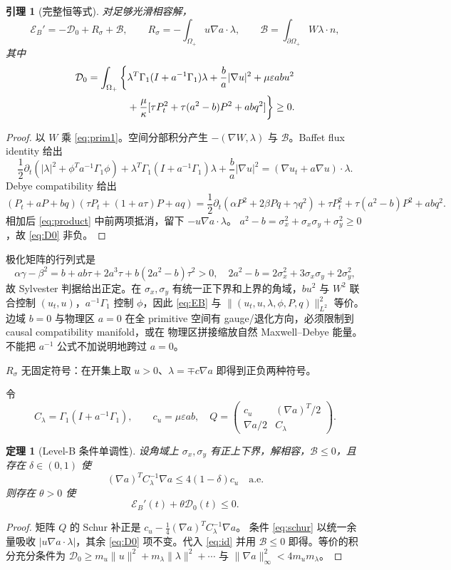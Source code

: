 \documentclass[UTF8,a4paper,11pt]{ctexart}
\newtheorem{lemma}{引理}
\newtheorem{theorem}{定理}
\newcommand{\E}{\mathcal E}
\newcommand{\D}{\mathcal D}
\newcommand{\Om}{\Omega}
\newcommand{\sx}{\sigma_x}
\newcommand{\sy}{\sigma_y}
\newcommand{\ep}{\varepsilon}
\newcommand{\ip}[2]{\left(#1,#2\right)}
\begin{document}
\begin{lemma}[完整恒等式]\label{lem:identity}
对足够光滑相容解，
\begin{equation}\label{eq:id}
 \E_B'=-\D_0+R_\sigma+\mathcal B,
 \qquad R_\sigma=-\int_{\Om_+}u\nabla a\cdot\lambda,
 \qquad \mathcal B=\int_{\partial\Om_+}W\lambda\cdot n,
\end{equation}
其中
\begin{align}\label{eq:D0}
\D_0=\int_{\Om_+}\bigg\{&
 \lambda^T\Gamma_1(I+a^{-1}\Gamma_1)\lambda+\frac ba|\nabla u|^2
 +\mu\ep ab u^2\\
&+\frac\mu\kappa[\tau P_t^2+\tau(a^2-b)P^2+abq^2]\bigg\}\ge0.\notag
\end{align}
\end{lemma}
\begin{proof}
以 $W$ 乘 \eqref{eq:prim1}。空间分部积分产生 $-\ip{\nabla W}{\lambda}$ 与
$\mathcal B$。Baffet flux identity 给出
\[
 \frac12\partial_t(|\lambda|^2+\phi^Ta^{-1}\Gamma_1\phi)
 +\lambda^T\Gamma_1(I+a^{-1}\Gamma_1)\lambda+\frac ba|\nabla u|^2
 =(\nabla u_t+a\nabla u)\cdot\lambda.
\]
Debye compatibility 给出
\[
(P_t+aP+bq)(\tau P_t+(1+a\tau)P+aq)
=\frac12\partial_t(\alpha P^2+2\beta Pq+\gamma q^2)
+\tau P_t^2+\tau(a^2-b)P^2+abq^2.
\]
相加后 \eqref{eq:product} 中前两项抵消，留下 $-u\nabla a\cdot\lambda$。
$a^2-b=\sx^2+\sx\sy+\sy^2\ge0$，故 \eqref{eq:D0} 非负。
\end{proof}

极化矩阵的行列式是
\[
 \alpha\gamma-\beta^2=b+ab\tau+2a^3\tau+b(2a^2-b)\tau^2>0,
\quad 2a^2-b=2\sx^2+3\sx\sy+2\sy^2,
\]
故 Sylvester 判据给出正定。在 $\sx,\sy$ 有统一正下界和上界的角域，$b u^2$ 与
$W^2$ 联合控制 $(u_t,u)$，$a^{-1}\Gamma_1$ 控制 $\phi$，因此 \eqref{eq:EB}
与 $\|(u_t,u,\lambda,\phi,P,q)\|_{L^2}^2$ 等价。边域 $b=0$ 与物理区 $a=0$
在全 primitive 空间有 gauge/退化方向，必须限制到 causal compatibility manifold，或在
物理区拼接缩放自然 Maxwell--Debye 能量。不能把 $a^{-1}$ 公式不加说明地跨过 $a=0$。

$R_\sigma$ 无固定符号：在开集上取 $u>0$、$\lambda=\mp c\nabla a$ 即得到正负两种符号。

令
\[
 C_\lambda=\Gamma_1(I+a^{-1}\Gamma_1),\qquad c_u=\mu\ep ab,
\quad Q=\begin{pmatrix}c_u&(\nabla a)^T/2\\ \nabla a/2&C_\lambda\end{pmatrix}.
\]
\begin{theorem}[Level-B 条件单调性]\label{thm:levelb}
设角域上 $\sx,\sy$ 有正上下界，解相容，$\mathcal B\le0$，且存在
$\delta\in(0,1)$ 使
\begin{equation}\label{eq:schur}
 (\nabla a)^TC_\lambda^{-1}\nabla a\le4(1-\delta)c_u
 \quad\text{a.e.}
\end{equation}
则存在 $\theta>0$ 使
\[
 \E_B'(t)+\theta\D_0(t)\le0.
\]
\end{theorem}
\begin{proof}
矩阵 $Q$ 的 Schur 补正是
$c_u-\frac14(\nabla a)^TC_\lambda^{-1}\nabla a$。
条件 \eqref{eq:schur} 以统一余量吸收
$|u\nabla a\cdot\lambda|$，其余 \eqref{eq:D0} 项不变。代入
\eqref{eq:id} 并用 $\mathcal B\le0$ 即得。等价的积分充分条件为
$\D_0\ge m_u\|u\|^2+m_\lambda\|\lambda\|^2+\cdots$ 与
$\|\nabla a\|_\infty^2<4m_um_\lambda$。
\end{proof}
\end{document}
